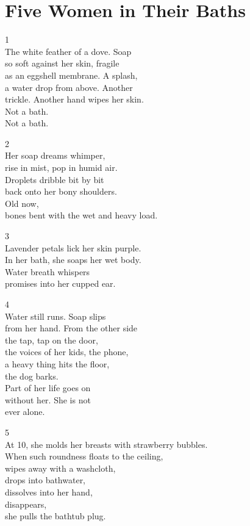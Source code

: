\documentclass[twoside,10pt]{book}
\begin{document}
\clearpage
\section{Five Women in Their Baths}

1\\
The white feather of a dove. Soap\\
so soft against her skin, fragile\\
as an eggshell membrane. A splash,\\
a water drop from above. Another\\
trickle. Another hand wipes her skin.\\
Not a bath.\\
Not a bath.

2\\
Her soap dreams whimper,\\
rise in mist, pop in humid air.\\
Droplets dribble bit by bit\\
back onto her bony shoulders.\\
Old now,\\
bones bent with the wet and heavy load.

3\\
Lavender petals lick her skin purple.\\
In her bath, she soaps her wet body.\\
Water breath whispers\\
promises into her cupped ear.

4\\
Water still runs. Soap slips\\
from her hand. From the other side\\
the tap, tap on the door,\\
the voices of her kids, the phone,\\
a heavy thing hits the floor,\\
the dog barks.\\
Part of her life goes on\\
without her. She is not\\
ever alone.

5\\
At 10, she molds her breasts with strawberry bubbles.\\
When such roundness floats to the ceiling,\\
wipes away with a washcloth,\\
drops into bathwater,\\
dissolves into her hand,\\
disappears,\\
she pulls the bathtub plug.
\end{document}
